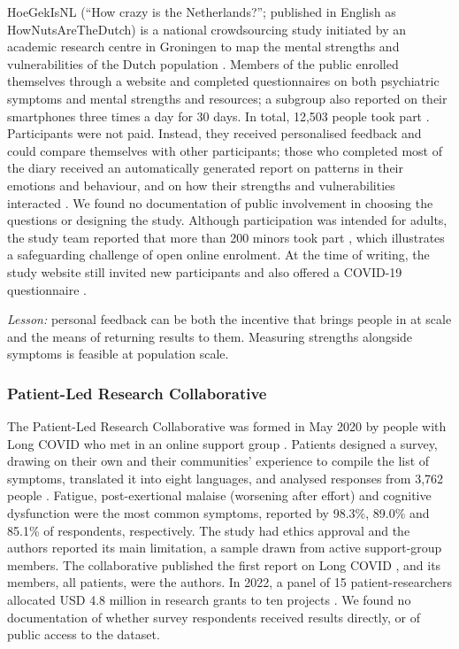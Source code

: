 \documentclass[
  number,
  preprint]{elsarticle}
\begin{document}
HoeGekIsNL (``How crazy is the Netherlands?''; published in English as
HowNutsAreTheDutch) is a national crowdsourcing study initiated by an
academic research centre in Groningen to map the mental strengths and
vulnerabilities of the Dutch population
\citep{vanderkrieke2016, mindwise2016}. Members of the public enrolled
themselves through a website and completed questionnaires on both
psychiatric symptoms and mental strengths and resources; a subgroup also
reported on their smartphones three times a day for 30 days. In total,
12,503 people took part \citep{vanderkrieke2016}. Participants were not
paid. Instead, they received personalised feedback and could compare
themselves with other participants; those who completed most of the
diary received an automatically generated report on patterns in their
emotions and behaviour, and on how their strengths and vulnerabilities
interacted \citep{mindwise2016}. We found no documentation of public
involvement in choosing the questions or designing the study. Although
participation was intended for adults, the study team reported that more
than 200 minors took part \citep{mindwise2016}, which illustrates a
safeguarding challenge of open online enrolment. At the time of writing,
the study website still invited new participants and also offered a
COVID-19 questionnaire \citep{hoegekis_web}.

\emph{Lesson:} personal feedback can be both the incentive that brings
people in at scale and the means of returning results to them. Measuring
strengths alongside symptoms is feasible at population scale.

\subsubsection{Patient-Led Research
Collaborative}\label{patient-led-research-collaborative}

The Patient-Led Research Collaborative was formed in May 2020 by people
with Long COVID who met in an online support group
\citep{mccorkell2021}. Patients designed a survey, drawing on their own
and their communities' experience to compile the list of symptoms,
translated it into eight languages, and analysed responses from 3,762
people \citep{davis2020preprint, davis2021}. Fatigue, post-exertional
malaise (worsening after effort) and cognitive dysfunction were the most
common symptoms, reported by 98.3\%, 89.0\% and 85.1\% of respondents,
respectively. The study had ethics approval and the authors reported its
main limitation, a sample drawn from active support-group members. The
collaborative published the first report on Long COVID
\citep{fitzgerald2024}, and its members, all patients, were the authors.
In 2022, a panel of 15 patient-researchers allocated USD 4.8 million in
research grants to ten projects \citep{plrc_fund}. We found no
documentation of whether survey respondents received results directly,
or of public access to the dataset.
\end{document}
